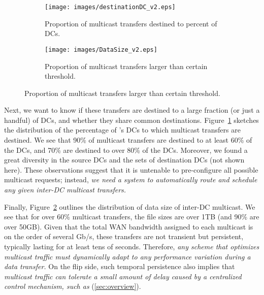 \begin{figure}[t]
        \centering
        \begin{subfigure}[b]{0.23\textwidth}
                \centering
                \texttt{[image: images/destinationDC\_v2.eps]}%
                \caption{Proportion of multicast transfers destined to percent of DCs.}
                \label{fig:bulk:dest}
        \end{subfigure}
	\hspace{0.1cm}
        \begin{subfigure}[b]{0.23\textwidth}
                \centering
                \texttt{[image: images/DataSize\_v2.eps]}
                \caption{Proportion of multicast transfers larger than certain threshold.}
                \label{fig:bulk:size}
        \end{subfigure}
        \label{fig:bulk}
\end{figure}

Next, we want to know if these transfers are destined to a large
fraction (or just a handful) of DCs, and whether they share common
destinations. Figure~\ref{fig:bulk:dest} sketches the distribution
of the percentage of \company's DCs to which multicast transfers
are destined. We see that 90\% of multicast transfers are destined to
at least 60\% of the DCs, and 70\% are destined to over 80\% of the DCs. Moreover,
we found a great diversity in the source DCs and the sets of destination
DCs (not shown here). These observations suggest that it is untenable
to pre-configure all possible multicast requests; instead, {\em we
need a system to automatically route and schedule any given inter-DC
multicast transfers.}

Finally, Figure~\ref{fig:bulk:size} outlines the distribution of data
size of inter-DC multicast. We see that for over 60\% multicast
transfers, the file sizes are over 1TB (and 90\% are over 50GB).
Given that the total WAN bandwidth assigned to each multicast is on
the order of several Gb/s, these transfers are not transient but
persistent, typically lasting for at least tens of seconds.
Therefore, {\em any scheme that optimizes multicast traffic must
dynamically adapt to any performance variation during a data transfer.}
On the flip side, such temporal persistence also implies that {\em
multicast traffic can tolerate a small amount of delay caused by
a centralized control mechanism, such as \name}
(\Section\ref{sec:overview}).


